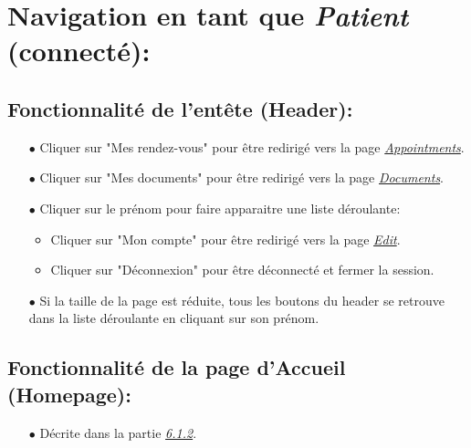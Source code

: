 \documentclass[a4paper]{report}
\begin{document}
\vspace{1.5cm}


\section{\noindent Navigation en tant que \textit{Patient} {\fontsize{12}{16}\selectfont(connecté)}: }
\vspace{0.6cm}

\subsection{Fonctionnalité de l'entête (Header):}\label{header}
    \begin{itemize}
        \item[$\bullet$] Cliquer sur "Mes rendez-vous" pour être redirigé vers la page \textit{\hyperref[appointments]{Appointments}}.
        \item[$\bullet$] Cliquer sur "Mes documents" pour être redirigé vers la page \textit{\hyperref[documents]{Documents}}.
        \item[$\bullet$] Cliquer sur le prénom pour faire apparaitre une liste déroulante:
        \begin{itemize}
            \item Cliquer sur "Mon compte" pour être redirigé vers la page \textit{\hyperref[edit]{Edit}}.
            \item Cliquer sur "Déconnexion" pour être déconnecté et fermer la session.
        \end{itemize}
        \item[$\bullet$] Si la taille de la page est réduite, tous les boutons du header se retrouve dans la liste déroulante en cliquant sur son prénom.
    \end{itemize}
    \vspace{3mm}

\subsection{Fonctionnalité de la page d'Accueil (Homepage):}
    \begin{itemize}
        \item[$\bullet$] Décrite dans la partie \textit{\hyperref[homepage]{6.1.2}}.
    \end{itemize}
    \vspace{3mm}
\end{document}
